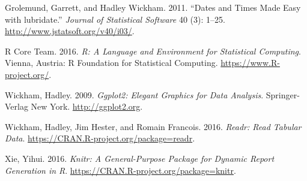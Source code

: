 \documentclass[]{article}
\theoremstyle{definition}
\theoremstyle{definition}
\theoremstyle{definition}
\theoremstyle{remark}
\begin{document}
\hypertarget{ref-lubridate}{}
Grolemund, Garrett, and Hadley Wickham. 2011. ``Dates and Times Made
Easy with lubridate.'' \emph{Journal of Statistical Software} 40 (3):
1--25. \url{http://www.jstatsoft.org/v40/i03/}.

\hypertarget{ref-baseR}{}
R Core Team. 2016. \emph{R: A Language and Environment for Statistical
Computing}. Vienna, Austria: R Foundation for Statistical Computing.
\url{https://www.R-project.org/}.

\hypertarget{ref-ggplot2}{}
Wickham, Hadley. 2009. \emph{Ggplot2: Elegant Graphics for Data
Analysis}. Springer-Verlag New York. \url{http://ggplot2.org}.

\hypertarget{ref-readr}{}
Wickham, Hadley, Jim Hester, and Romain Francois. 2016. \emph{Readr:
Read Tabular Data}. \url{https://CRAN.R-project.org/package=readr}.

\hypertarget{ref-knitr}{}
Xie, Yihui. 2016. \emph{Knitr: A General-Purpose Package for Dynamic
Report Generation in R}. \url{https://CRAN.R-project.org/package=knitr}.
\end{document}

